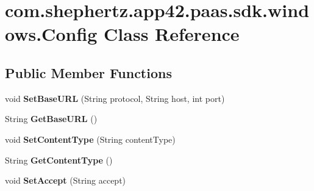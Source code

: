 \hypertarget{classcom_1_1shephertz_1_1app42_1_1paas_1_1sdk_1_1windows_1_1_config}{\section{com.\+shephertz.\+app42.\+paas.\+sdk.\+windows.\+Config Class Reference}
\label{classcom_1_1shephertz_1_1app42_1_1paas_1_1sdk_1_1windows_1_1_config}
}
\subsection*{Public Member Functions}
\begin{DoxyCompactItemize}
\item 
\hypertarget{classcom_1_1shephertz_1_1app42_1_1paas_1_1sdk_1_1windows_1_1_config_a560eae53cd9dbe8149a0245c354f4c41}{void {\bfseries Set\+Base\+U\+R\+L} (String protocol, String host, int port)}\label{classcom_1_1shephertz_1_1app42_1_1paas_1_1sdk_1_1windows_1_1_config_a560eae53cd9dbe8149a0245c354f4c41}

\item 
\hypertarget{classcom_1_1shephertz_1_1app42_1_1paas_1_1sdk_1_1windows_1_1_config_a8c9a5037a145cba04a15880c96da59f3}{String {\bfseries Get\+Base\+U\+R\+L} ()}\label{classcom_1_1shephertz_1_1app42_1_1paas_1_1sdk_1_1windows_1_1_config_a8c9a5037a145cba04a15880c96da59f3}

\item 
\hypertarget{classcom_1_1shephertz_1_1app42_1_1paas_1_1sdk_1_1windows_1_1_config_a79ade73a8a1f4ed9c00d2029dafc8d96}{void {\bfseries Set\+Content\+Type} (String content\+Type)}\label{classcom_1_1shephertz_1_1app42_1_1paas_1_1sdk_1_1windows_1_1_config_a79ade73a8a1f4ed9c00d2029dafc8d96}

\item 
\hypertarget{classcom_1_1shephertz_1_1app42_1_1paas_1_1sdk_1_1windows_1_1_config_aeb693353760b0a1cea7e8786a5d60291}{String {\bfseries Get\+Content\+Type} ()}\label{classcom_1_1shephertz_1_1app42_1_1paas_1_1sdk_1_1windows_1_1_config_aeb693353760b0a1cea7e8786a5d60291}

\item 
\hypertarget{classcom_1_1shephertz_1_1app42_1_1paas_1_1sdk_1_1windows_1_1_config_abe3a047e79f7b35f917382947ee7c5d2}{void {\bfseries Set\+Accept} (String accept)}\label{classcom_1_1shephertz_1_1app42_1_1paas_1_1sdk_1_1windows_1_1_config_abe3a047e79f7b35f917382947ee7c5d2}


\end{DoxyCompactItemize}
